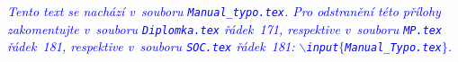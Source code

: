 \textcolor{blue}{\em Tento text se nachází v~souboru \texttt{\cestaStyles Manual\_typo.tex}. Pro odstranění této přílohy zakomentujte v~souboru \texttt{Diplomka.tex} řádek~171, respektive v~souboru \texttt{MP.tex} řádek~181, respektive v~souboru \texttt{SOC.tex} řádek~181\?: \texttt{$\backslash$input$\{$\cestaStyles Manual\_Typo.tex$\}$}.\/} 
